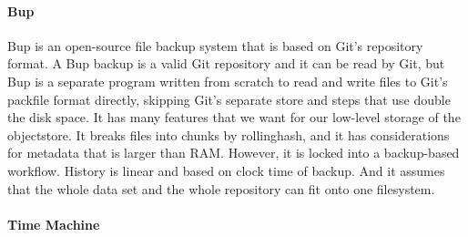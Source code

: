 \paragraph{Bup}\label{related_bup}

Bup \cite{bup_homepage} is an open-source file backup system that is based on
Git's repository format. A Bup backup is a valid Git repository and it can be
read by Git, but Bup is a separate program written from scratch to read and
write files to Git's \gls{packfile} format directly, skipping Git's separate
store and  steps that use double the disk space. It has
many features that we want for our low-level storage of the \gls{objectstore}.
It breaks files into chunks by \gls{rollinghash}, and it has considerations for
metadata that is larger than RAM. However, it is locked into a backup-based
workflow. History is linear and based on clock time of backup. And it assumes
that the whole data set and the whole repository can fit onto one filesystem.


\paragraph{Time Machine}

